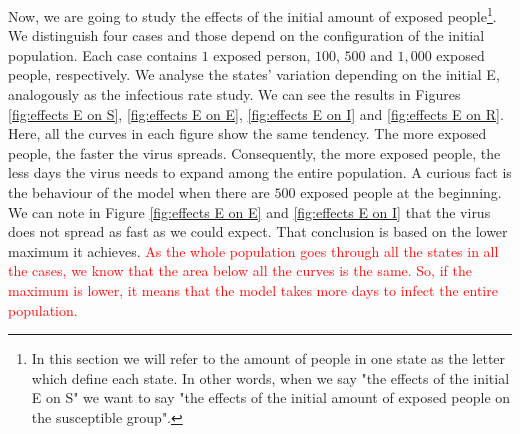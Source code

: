 \documentclass[a4paper]{article}
\begin{document}
Now, we are going to study the effects of the initial amount of exposed people\footnote{In this section we will refer to the amount of people in one state as the letter which define each state. In other words, when we say "the effects of the initial E on S" we want to say "the effects of the initial amount of exposed people on the susceptible group".}. We distinguish four cases and those depend on the configuration of the initial population. Each case contains $1$ exposed person, $100$, $500$ and $1,000$ exposed people, respectively. We analyse the states' variation depending on the initial E, analogously as the infectious rate study. We can see the results in Figures \ref{fig:effects E on S}, \ref{fig:effects E on E}, \ref{fig:effects E on I} and \ref{fig:effects E on R}. Here, all the curves in each figure show the same tendency. The more exposed people, the faster the virus spreads. Consequently, the more exposed people, the less days the virus needs to expand among the entire population. A curious fact is the behaviour of the model when there are $500$ exposed people at the beginning. We can note in Figure \ref{fig:effects E on E} and \ref{fig:effects E on I} that the virus does not spread as fast as we could expect. That conclusion is based on the lower maximum it achieves. \textcolor{red}{As the whole population goes through all the states in all the cases, we know that the area below all the curves is the same. So, if the maximum is lower, it means that the model takes more days to infect the entire population.} 
 
\end{document}
